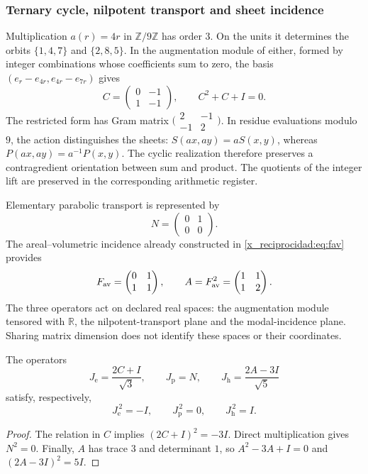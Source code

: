 \subsubsection{Ternary cycle, nilpotent transport and sheet incidence}

Multiplication \(a(r)=4r\) in \(\mathbb Z/9\mathbb Z\) has order
\(3\). On the units it determines the orbits \(\{1,4,7\}\) and
\(\{2,8,5\}\). In the augmentation module of either, formed by
integer combinations whose coefficients sum to zero, the basis
\((e_r-e_{4r},e_{4r}-e_{7r})\) gives
\[
 C=\begin{pmatrix}0&-1\\1&-1\end{pmatrix},
 \qquad C^2+C+I=0.
\]
The restricted form has Gram matrix
\(\bigl(\begin{smallmatrix}2&-1\\-1&2\end{smallmatrix}\bigr)\).
In residue evaluations modulo \(9\), the action distinguishes the sheets:
\(S(ax,ay)=aS(x,y)\), whereas \(P(ax,ay)=a^{-1}P(x,y)\).
The cyclic realization therefore preserves a contragredient orientation
between sum and product. The quotients of the integer lift are preserved
in the corresponding arithmetic register.

Elementary parabolic transport is represented by
\[
 N=\begin{pmatrix}0&1\\0&0\end{pmatrix}.
\]
The areal--volumetric incidence already constructed in \eqref{x_reciprocidad:eq:fav} provides
\[
 F_{\rm av}=\begin{pmatrix}0&1\\1&1\end{pmatrix},
 \qquad A=F_{\rm av}^2=\begin{pmatrix}1&1\\1&2\end{pmatrix}.
\]
The three operators act on declared real spaces: the augmentation
module tensored with \(\mathbb R\), the nilpotent-transport plane and
the modal-incidence plane. Sharing matrix dimension does not identify
these spaces or their coordinates.

\begin{proposition}
\label{x_reciprocidad:euler-trit-generadores}
The operators
\[
 J_{\mathrm e}=\frac{2C+I}{\sqrt3},\qquad
 J_{\mathrm p}=N,\qquad
 J_{\mathrm h}=\frac{2A-3I}{\sqrt5}
\]
satisfy, respectively,
\[
 J_{\mathrm e}^{\,2}=-I,\qquad
 J_{\mathrm p}^{\,2}=0,\qquad
 J_{\mathrm h}^{\,2}=I.
\]
\end{proposition}
\begin{proof}
The relation in \(C\) implies \((2C+I)^2=-3I\).
Direct multiplication gives \(N^2=0\).
Finally, \(A\) has trace \(3\) and determinant \(1\), so
\(A^2-3A+I=0\) and \((2A-3I)^2=5I\).
\end{proof}

